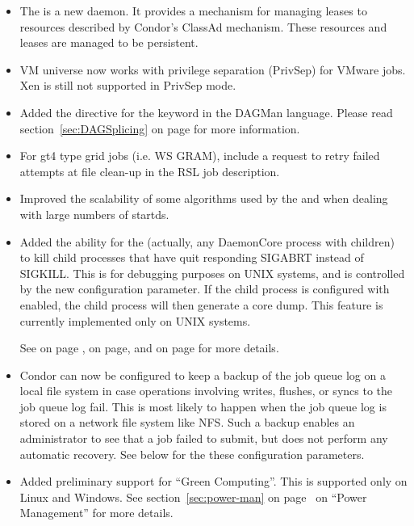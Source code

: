 \begin{itemize}
\item The  is a new daemon.  It
  provides a mechanism for managing leases to resources described by
  Condor's ClassAd mechanism.  These resources and leases are managed
  to be persistent.

\item VM universe now works with privilege separation (PrivSep)
for VMware jobs. Xen is still not supported in PrivSep mode.

\item Added the  directive for the  keyword in
the DAGMan language.
Please read section~\ref{sec:DAGSplicing} on page \pageref{sec:DAGSplicing} for
more information.

\item For gt4 type grid jobs (i.e. WS GRAM), include a request to retry
failed attempts at file clean-up in the RSL job description.

\item Improved the scalability of some algorithms used by the
 and  when dealing with large
numbers of startds.

\item Added the ability for the  (actually, any
  DaemonCore process with children) to kill child
  processes that have quit responding SIGABRT instead of SIGKILL.
  This is for debugging purposes on UNIX systems, and is controlled by
  the new  configuration
  parameter.  If the child process is configured with
   enabled, the child process will then
  generate a core dump.
  This feature is currently implemented only on UNIX systems.

  See
  on page \pageref{param:NotRespondingWantCore},
  on page\pageref{param:NotRespondingTimeout},
  and
  on page \pageref{param:CreateCoreFiles}
  for more details.

\item Condor can now be configured to keep a backup of the job queue
  log on a local file system in case  operations
  involving writes, flushes, or syncs to the job queue log fail.  This
  is most likely to happen when the job queue log is stored on a
  network file system like NFS. Such a backup enables an administrator
  to see that a job failed to submit, but does not perform any
  automatic recovery.  See below for the these configuration parameters.

\item Added preliminary support for ``Green Computing''.  This is
  supported only on Linux and Windows.
  See section~\ref{sec:power-man} on page~\pageref{sec:power-man} on
  ``Power Management'' for more details.

\end{itemize}

